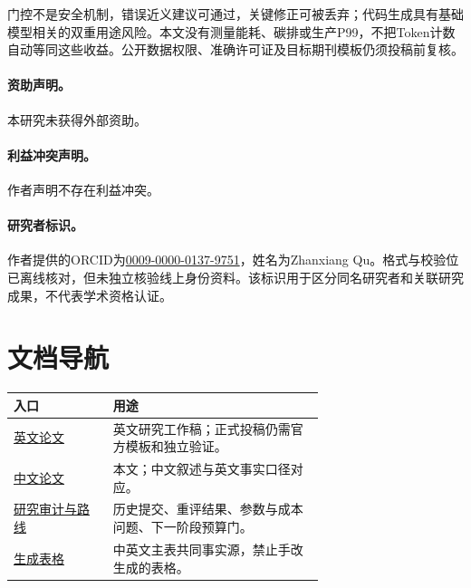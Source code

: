 \documentclass[11pt,a4paper]{article}
\begin{document}
门控不是安全机制，错误近义建议可通过，关键修正可被丢弃；代码生成具有基础模型相关的双重用途风险。本文没有测量能耗、碳排或生产P99，不把Token计数自动等同这些收益。公开数据权限、准确许可证及目标期刊模板仍须投稿前复核。

\paragraph{资助声明。}本研究未获得外部资助。
\paragraph{利益冲突声明。}作者声明不存在利益冲突。
\paragraph{研究者标识。}作者提供的ORCID为\href{https://orcid.org/0009-0000-0137-9751}{0009-0000-0137-9751}，姓名为Zhanxiang Qu。格式与校验位已离线核对，但未独立核验线上身份资料。该标识用于区分同名研究者和关联研究成果，不代表学术资格认证。

\section{文档导航}
\begin{tabular}{@{}lp{0.68\linewidth}@{}}
\toprule
入口 & 用途 \\
\midrule
\href{paper.pdf}{英文论文} & 英文研究工作稿；正式投稿仍需官方模板和独立验证。\\
\href{paper_zh.pdf}{中文论文} & 本文；中文叙述与英文事实口径对应。\\
\href{gap1_claim_audit_trail.md}{研究审计与路线} & 历史提交、重评结果、参数与成本问题、下一阶段预算门。\\
\href{../scripts/export_latex_tables.py}{生成表格} & 中英文主表共同事实源，禁止手改生成的表格。\\
\bottomrule
\end{tabular}



\end{document}
